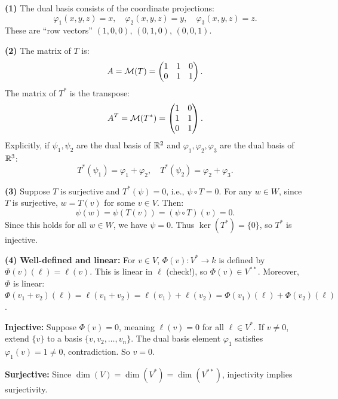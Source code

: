 \documentclass{report}
\begin{document}
\begin{solution}
\textbf{(1)} The dual basis consists of the coordinate projections:
\[\varphi_1(x, y, z) = x, \quad \varphi_2(x, y, z) = y, \quad \varphi_3(x, y, z) = z.\]
These are ``row vectors'' \((1, 0, 0)\), \((0, 1, 0)\), \((0, 0, 1)\).

\textbf{(2)} The matrix of \(T\) is:
\[A = \mathcal{M}(T) = \begin{pmatrix} 1 & 1 & 0 \\ 0 & 1 & 1 \end{pmatrix}.\]
The matrix of \(T^*\) is the transpose:
\[A^T = \mathcal{M}(T^*) = \begin{pmatrix} 1 & 0 \\ 1 & 1 \\ 0 & 1 \end{pmatrix}.\]
Explicitly, if \(\psi_1, \psi_2\) are the dual basis of \(\RR^2\) and \(\varphi_1, \varphi_2, \varphi_3\) are the dual basis of \(\RR^3\):
\[T^*(\psi_1) = \varphi_1 + \varphi_2, \quad T^*(\psi_2) = \varphi_2 + \varphi_3.\]

\textbf{(3)} Suppose \(T\) is surjective and \(T^*(\psi) = 0\), i.e., \(\psi \circ T = 0\). For any \(w \in W\), since \(T\) is surjective, \(w = T(v)\) for some \(v \in V\). Then:
\[\psi(w) = \psi(T(v)) = (\psi \circ T)(v) = 0.\]
Since this holds for all \(w \in W\), we have \(\psi = 0\). Thus \(\ker(T^*) = \{0\}\), so \(T^*\) is injective.

\textbf{(4)} \textbf{Well-defined and linear:} For \(v \in V\), \(\Phi(v) : V^* \to k\) is defined by \(\Phi(v)(\ell) = \ell(v)\). This is linear in \(\ell\) (check!), so \(\Phi(v) \in V^{**}\). Moreover, \(\Phi\) is linear: \(\Phi(v_1 + v_2)(\ell) = \ell(v_1 + v_2) = \ell(v_1) + \ell(v_2) = \Phi(v_1)(\ell) + \Phi(v_2)(\ell)\).

\textbf{Injective:} Suppose \(\Phi(v) = 0\), meaning \(\ell(v) = 0\) for all \(\ell \in V^*\). If \(v \neq 0\), extend \(\{v\}\) to a basis \(\{v, v_2, \ldots, v_n\}\). The dual basis element \(\varphi_1\) satisfies \(\varphi_1(v) = 1 \neq 0\), contradiction. So \(v = 0\).

\textbf{Surjective:} Since \(\dim(V) = \dim(V^*) = \dim(V^{**})\), injectivity implies surjectivity.
\end{solution}
\end{document}
